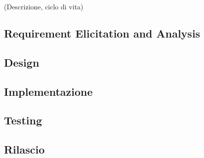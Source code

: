 

(Descrizione, ciclo di vita)

\subsection{Requirement Elicitation and Analysis}



\subsection{Design}

\subsection{Implementazione}

\subsection{Testing}

\subsection{Rilascio}